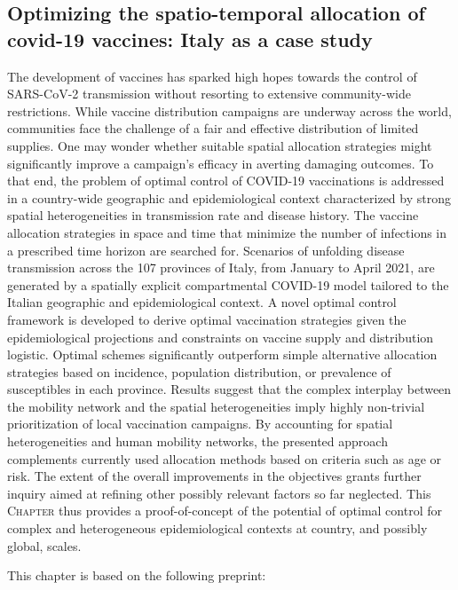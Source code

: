 \begin{fullwidth}
	\chapter[Optimizing the spatio-temporal allocation of  covid-19 vaccines: Italy as a case study]{Optimizing the spatio-temporal allocation of \\covid-19 vaccines: Italy as a case study}
\label{ch:covid-italy-ocp}

The development of vaccines has sparked high hopes towards the control of SARS-CoV-2 transmission without resorting to extensive community-wide restrictions. While vaccine distribution campaigns are underway across the world, communities face the challenge of a fair and effective distribution of limited supplies. One may wonder whether suitable spatial allocation strategies might significantly improve a campaign's efficacy in averting damaging outcomes. To that end, the problem of optimal control of COVID-19 vaccinations is addressed in a country-wide geographic and epidemiological context characterized by strong spatial heterogeneities in transmission rate and disease history. The vaccine allocation strategies in space and time that minimize the number of infections in a prescribed time horizon are searched for. Scenarios of unfolding disease transmission across the 107 provinces of Italy, from January to April 2021, are generated by a spatially explicit compartmental COVID-19 model tailored to the Italian geographic and epidemiological context\parencite{Bertuzzo:GeographyCOVID19Spread:2020,Gatto:SpreadDynamicsCOVID19:2020}. A novel optimal control framework is developed to derive optimal vaccination strategies given the epidemiological projections and constraints on vaccine supply and distribution logistic. Optimal schemes significantly outperform simple alternative allocation strategies based on incidence, population distribution, or prevalence of susceptibles in each province. Results suggest that the complex interplay between the mobility network and the spatial heterogeneities imply highly non-trivial prioritization of local vaccination campaigns. By accounting for spatial heterogeneities and human mobility networks, the presented approach complements currently used allocation methods based on criteria such as age or risk. The extent of the overall improvements in the objectives grants further inquiry aimed at refining other possibly relevant factors so far neglected. This \textsc{Chapter} thus provides a proof-of-concept of the potential of optimal control for complex and heterogeneous epidemiological contexts at country, and possibly global, scales. 

This chapter is based on the following preprint: 


\end{fullwidth}

